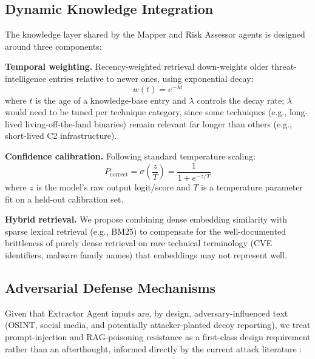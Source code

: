 \documentclass[runningheads]{llncs}
\begin{document}
\subsection{Dynamic Knowledge Integration}
\label{sec:knowledge}

The knowledge layer shared by the Mapper and Risk Assessor agents is designed around three components:

\textbf{Temporal weighting.} Recency-weighted retrieval down-weights older threat-intelligence entries relative to newer ones, using exponential decay:
\begin{equation}
w(t) = e^{-\lambda t}
\label{eq:temporal}
\end{equation}
where $t$ is the age of a knowledge-base entry and $\lambda$ controls the decay rate; $\lambda$ would need to be tuned per technique category, since some techniques (e.g., long-lived living-off-the-land binaries) remain relevant far longer than others (e.g., short-lived C2 infrastructure).

\textbf{Confidence calibration.} Following standard temperature scaling:
\begin{equation}
P_{\text{correct}} = \sigma\!\left(\frac{z}{T}\right) = \frac{1}{1 + e^{-z/T}}
\label{eq:calibration}
\end{equation}
where $z$ is the model's raw output logit/score and $T$ is a temperature parameter fit on a held-out calibration set.

\textbf{Hybrid retrieval.} We propose combining dense embedding similarity with sparse lexical retrieval (e.g., BM25) to compensate for the well-documented brittleness of purely dense retrieval on rare technical terminology (CVE identifiers, malware family names) that embeddings may not represent well.

\subsection{Adversarial Defense Mechanisms}
\label{sec:defense}

Given that Extractor Agent inputs are, by design, adversary-influenced text (OSINT, social media, and potentially attacker-planted decoy reporting), we treat prompt-injection and RAG-poisoning resistance as a first-class design requirement rather than an afterthought, informed directly by the current attack literature \cite{poisonedrag2025,promptinjectionreview2026,owaspllm2025}:
\end{document}
